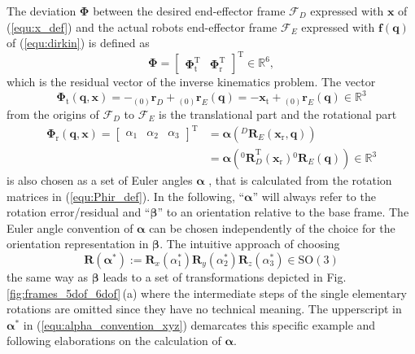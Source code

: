 \documentclass{svproc}
\newcommand{\bm}[1]{\boldsymbol{#1}}
\newcommand{\ortvek}[4]{{ }_{(#1)}{\boldsymbol{#2}}^{#3}_{#4} }
\newcommand{\rotmat}[2]{{{ }^{#1}\boldsymbol{R}}_{#2}}
\newcommand{\transp}[0]{{\mathrm{T}}}
\newcommand{\ks}[1]{{\mathcal{F}}_{#1}}
\begin{document}
%
The deviation $\bm{\Phi}$ between the desired end-effector frame $\ks{D}$ expressed with $\bm{x}$ of (\ref{equ:x_def}) and the actual robots end-effector frame $\ks{E}$ expressed with $\bm{f}(\bm{q})$ of (\ref{equ:dirkin}) is defined as
\vspace{-0.5em}
%
\begin{equation}
\bm{\Phi}=\begin{bmatrix}
\bm{\Phi}_{\mathrm{t}}^\transp & \bm{\Phi}_{\mathrm{r}}^\transp
\end{bmatrix}^\transp \in {\mathbb{R}}^{6},
\label{equ:Phi_def}
\end{equation}
%
which is the residual vector of the inverse kinematics problem.
The vector
%
\begin{equation}
\bm{\Phi}_{\mathrm{t}}(\bm{q},\bm{x})
=
- \ortvek{0}{r}{}{D} + \ortvek{0}{r}{}{E}(\bm{q})
=
- \bm{x}_{\mathrm{t}} + \ortvek{0}{r}{}{E}(\bm{q})
 \in {\mathbb{R}}^{3}
\label{equ:Phit_def}
\end{equation}
%
from the origins of $\ks{D}$ to $\ks{E}$ is the translational part and the rotational part
%
\begin{align}
\bm{\Phi}_{\mathrm{r}}(\bm{q},\bm{x}) 
= \begin{bmatrix}
\alpha_1  & \alpha_2 & \alpha_3
\end{bmatrix}^\transp
&=\bm{\alpha}\left(\rotmat{D}{E}(\bm{x}_{\mathrm{r}},\bm{q})\right)\nonumber \\
&=\bm{\alpha}\left(\rotmat{0}{D}^\transp (\bm{x}_{\mathrm{r}})\rotmat{0}{E}(\bm{q})\right) \in {\mathbb{R}}^{3}
\label{equ:Phir_def}
\end{align}
%
is also chosen as a set of Euler angles $\bm{\alpha}$ \cite{GoldenbergBenFen1985}, that is calculated from the rotation matrices in (\ref{equ:Phir_def}).
In the following, ``$\bm{\alpha}$'' will always refer to the rotation error/residual and ``$\bm{\beta}$'' to an orientation relative to the base frame.
The Euler angle convention of $\bm{\alpha}$ can be chosen independently of the choice for the orientation representation in  $\bm{\beta}$.
The intuitive approach of choosing
%
\begin{equation}
\bm{R}(\bm{\alpha}^*) := \bm{R}_x(\alpha_1^*) \bm{R}_y(\alpha_2^*) \bm{R}_z(\alpha_3^*) \in \mathrm{SO(3)}
\label{equ:alpha_convention_xyz}
\end{equation}
%
the same way as $\bm{\beta}$ leads to a set of transformations depicted in Fig.\,\ref{fig:frames_5dof_6dof}\,(a) where the intermediate steps of the single elementary rotations are omitted since they have no technical meaning.
The upperscript in $\bm{\alpha}^*$ in (\ref{equ:alpha_convention_xyz}) demarcates this specific example and following elaborations on the calculation of $\bm{\alpha}$.
%
\end{document}
